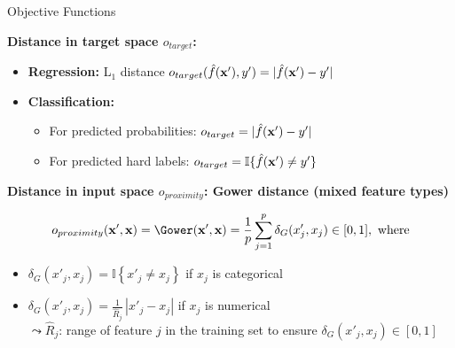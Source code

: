 \documentclass[10pt,compress,t,notes=noshow, xcolor=table]{beamer}
\begin{document}
\begin{frame}{Objective Functions }

\textbf{Distance in target space $o_{target}$:}

\begin{itemize}
  \item \textbf{Regression:} L$_1$ distance   
  $o_{target}(\hat{f}(\mathbf{x}'), y') = | \hat{f}(\mathbf{x}') - y'|$
  
  \item \textbf{Classification:}  
  \begin{itemize}
    \item For predicted probabilities: $o_{target} = | \hat{f}(\mathbf{x}') - y'|$
    \item For predicted hard labels: $o_{target} = \mathbb{I} \{ \hat{f}(\mathbf{x}') \ne y'\}$
  \end{itemize}
\end{itemize}

\pause

\textbf{Distance in input space $o_{proximity}$: Gower distance (mixed feature types)}

\[
o_{proximity}(\xv', \xv) = \Gower(\xv', \xv) = \frac{1}{p} \sum_{j = 1}^{p} \delta_G(x'_j, x_j) \in [0, 1], \text{ where}
\]


\begin{itemize}
  \item $\delta_G(x'_j, x_j) = \mathbb{I} \left\{ x'_j \ne x_j \right\}$ if $x_j$ is categorical
  \item $\delta_G(x'_j, x_j) = \frac{1}{\widehat{R}_j} \, |x'_j - x_j| $ if $x_j$ is numerical\\
  $\leadsto \widehat{R}_j$: range of feature $j$ in the training set to ensure $\delta_G(x'_j, x_j) \in [0, 1]$
\end{itemize}

\end{frame}


	
\end{document}
